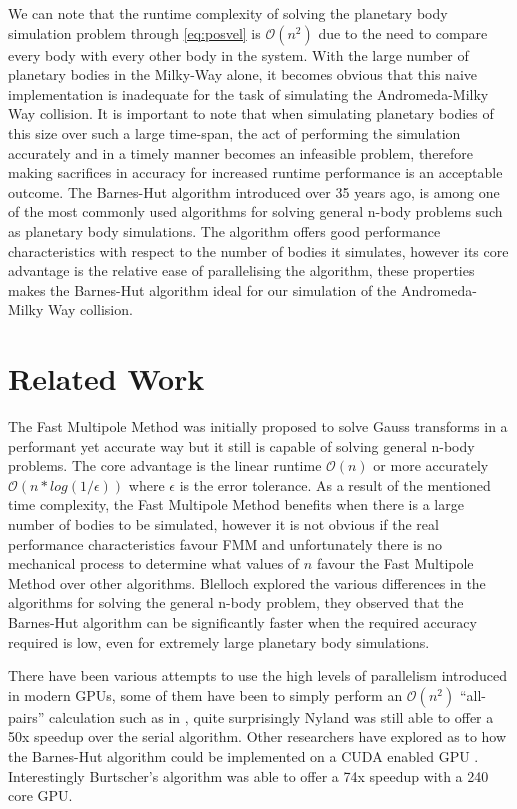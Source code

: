 \documentclass[acmtog,screen, nonacm=true]{acmart}
\begin{document}
We can note that the runtime complexity of solving the planetary body simulation problem through \eqref{eq:posvel} is $\mathcal{O}(n^2)$ due to the need to compare every body with every other body in the system. 
With the large number of planetary bodies in the Milky-Way alone, it becomes obvious that this naive implementation is inadequate for the task of simulating the Andromeda-Milky Way collision. It is important to note that when simulating planetary bodies of this size over such a large time-span, the act of performing the simulation accurately and in a timely manner becomes an infeasible problem, therefore making sacrifices in accuracy for increased runtime performance is an acceptable outcome. 
The Barnes-Hut \cite{barnes1986hierarchical} algorithm introduced over 35 years ago, is among one of the most commonly used algorithms for solving general n-body problems such as planetary body simulations. The algorithm offers good performance characteristics with respect to the number of bodies it simulates, however its core advantage is the relative ease of parallelising the algorithm, these properties makes the Barnes-Hut algorithm ideal for our simulation of the Andromeda-Milky Way collision. 

\section{Related Work}
The Fast Multipole Method \cite{greengard1991fast} was initially proposed to solve Gauss transforms in a performant yet accurate way but it still is capable of solving general n-body problems. The core advantage is the linear runtime $\mathcal{O}(n)$ or more accurately $\mathcal{O}(n*log(1/\epsilon))$ where $\epsilon$ is the error tolerance. As a result of the mentioned time complexity, the Fast Multipole Method benefits when there is a large number of bodies to be simulated, however it is not obvious if the real performance characteristics favour FMM and unfortunately there is no mechanical process to determine what values of $n$ favour the Fast Multipole Method over other algorithms. Blelloch \cite{blelloch1997practical} explored the various differences in the algorithms for solving the general n-body problem, they observed that the Barnes-Hut algorithm can be significantly faster when the required accuracy required is low, even for extremely large planetary body simulations. 

There have been various attempts to use the high levels of parallelism introduced in modern GPUs, some of them have been to simply perform an $\mathcal{O}(n^2)$ ``all-pairs'' calculation such as in \cite{nylons2007fast}, quite surprisingly Nyland \cite{nylons2007fast} was still able to offer a 50x speedup over the serial algorithm. Other researchers have explored as to how the Barnes-Hut algorithm could be implemented on a CUDA enabled GPU \cite{burtscher2011efficient}. Interestingly Burtscher's algorithm \cite{burtscher2011efficient} was able to offer a 74x speedup with a 240 core GPU.  
\end{document}
